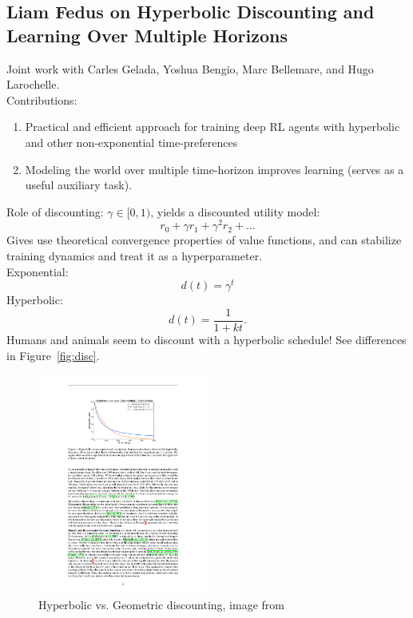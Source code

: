 \spacerule

\subsection{Liam Fedus on Hyperbolic Discounting and
Learning Over Multiple Horizons}

Joint work with Carles Gelada, Yoshua Bengio, Marc Bellemare, and Hugo Larochelle. \\

Contributions:
\begin{enumerate}
    \item Practical and efficient approach for training deep RL agents with hyperbolic and other non-exponential time-preferences
    \item Modeling the world over multiple time-horizon improves learning (serves as a useful auxiliary task).
\end{enumerate}

Role of discounting: $\gamma \in [0,1)$, yields a discounted utility model:
\[
r_0 + \gamma r_1 + \gamma^2 r_2 + \ldots
\]
Gives use theoretical convergence properties of value functions, and can stabilize training dynamics and treat it as a hyperparameter. \\

Exponential:
\[
d(t) = \gamma^t
\]
Hyperbolic:
\[
d(t) = \frac{1}{1+kt}.
\]
Humans and animals seem to discount with a hyperbolic schedule! See differences in Figure~\ref{fig:disc}.

\begin{figure}
    \centering
    \includegraphics[width=0.5\textwidth]{images/disc.pdf}
    \caption{Hyperbolic vs. Geometric discounting, image from~\citet{fedus2019hyperbolic}}
    \label{fig:my_label}
\end{figure}

